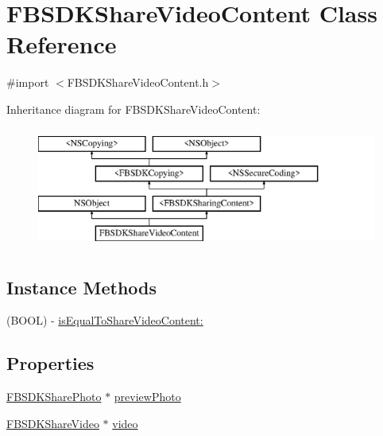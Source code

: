 \hypertarget{interface_f_b_s_d_k_share_video_content}{}\section{F\+B\+S\+D\+K\+Share\+Video\+Content Class Reference}
\label{interface_f_b_s_d_k_share_video_content}


{\ttfamily \#import $<$F\+B\+S\+D\+K\+Share\+Video\+Content.\+h$>$}

Inheritance diagram for F\+B\+S\+D\+K\+Share\+Video\+Content\+:\begin{figure}[H]
\begin{center}
\leavevmode
\includegraphics[height=4.000000cm]{interface_f_b_s_d_k_share_video_content}
\end{center}
\end{figure}
\subsection*{Instance Methods}
\begin{DoxyCompactItemize}
\item 
(B\+O\+O\+L) -\/ \hyperlink{interface_f_b_s_d_k_share_video_content_a85be057c7487e289753bc586dffdb399}{is\+Equal\+To\+Share\+Video\+Content\+:}
\end{DoxyCompactItemize}
\subsection*{Properties}
\begin{DoxyCompactItemize}
\item 
\hyperlink{interface_f_b_s_d_k_share_photo}{F\+B\+S\+D\+K\+Share\+Photo} $\ast$ \hyperlink{interface_f_b_s_d_k_share_video_content_a3a4422e8ca98246301cd55ecf6689e8b}{preview\+Photo}
\item 
\hyperlink{interface_f_b_s_d_k_share_video}{F\+B\+S\+D\+K\+Share\+Video} $\ast$ \hyperlink{interface_f_b_s_d_k_share_video_content_a7808add937d3fe59f3589e9e48d04612}{video}
\end{DoxyCompactItemize}


